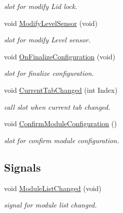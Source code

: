 \begin{DoxyCompactItemize}
\begin{DoxyCompactList}\small\item\em slot for modify \-Lid lock. \end{DoxyCompactList}\item 
void \hyperlink{classSystemTracking_1_1CRetort_a04275525d8b9ffdbd14e8cd26dde834a}{\-Modify\-Level\-Sensor} (void)
\begin{DoxyCompactList}\small\item\em slot for modify \-Level sensor. \end{DoxyCompactList}\item 
void \hyperlink{classSystemTracking_1_1CRetort_a83194e5b0ffb493daada9c96b336ce04}{\-On\-Finalize\-Configuration} (void)
\begin{DoxyCompactList}\small\item\em slot for finalize configuration. \end{DoxyCompactList}\item 
void \hyperlink{classSystemTracking_1_1CRetort_a1bc4ad1066046e21471e96b827997921}{\-Current\-Tab\-Changed} (int \-Index)
\begin{DoxyCompactList}\small\item\em call slot when current tab changed. \end{DoxyCompactList}\item 
void \hyperlink{classSystemTracking_1_1CRetort_aa694358a8100998a9422a9539fc337ea}{\-Confirm\-Module\-Configuration} ()
\begin{DoxyCompactList}\small\item\em slot for confirm module configuration. \end{DoxyCompactList}\end{DoxyCompactItemize}
\subsection*{\-Signals}
\begin{DoxyCompactItemize}
\item 
void \hyperlink{classSystemTracking_1_1CRetort_a3a84f3aed765299055c9396f5f07bcf8}{\-Module\-List\-Changed} (void)
\begin{DoxyCompactList}\small\item\em signal for module list changed. \end{DoxyCompactList}\end{DoxyCompactItemize}
